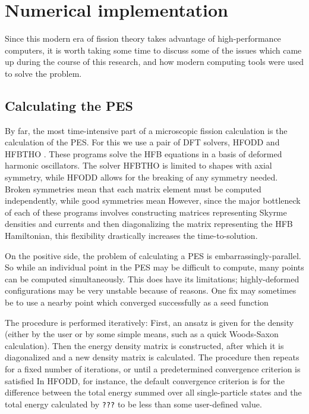 \chapter{Numerical implementation}\label{chap:Numerical}

Since this modern era of fission theory takes advantage of high-performance computers, it is worth taking some time to discuss some of the issues which came up during the course of this research, and how modern computing tools were used to solve the problem.

\section{Calculating the PES}
By far, the most time-intensive part of a microscopic fission calculation is the calculation of the PES. For this we use a pair of DFT solvers, HFODD \cite{Schunck2017} and HFBTHO \cite{Perez2017}. These programs solve the HFB equations in a basis of deformed harmonic oscillators. The solver HFBTHO is limited to shapes with axial symmetry, while HFODD allows for the breaking of any symmetry needed. Broken symmetries mean that each matrix element must be computed independently, while good symmetries mean However, since the major bottleneck of each of these programs involves constructing matrices representing Skyrme densities and currents and then diagonalizing the matrix representing the HFB Hamiltonian, this flexibility drastically increases the time-to-solution.

On the positive side, the problem of calculating a PES is embarrassingly-parallel. So while an individual point in the PES may be difficult to compute, many points can be computed simultaneously. This does have its limitations; highly-deformed configurations may be very unstable because of reasons. One fix may sometimes be to use a nearby point which converged successfully as a seed function

The procedure is performed iteratively: First, an ansatz is given for the density (either by the user or by some simple means, such as a quick Woods-Saxon calculation). Then the energy density matrix is constructed, after which it is diagonalized and a new density matrix is calculated. The procedure then repeats for a fixed number of iterations, or until a predetermined convergence criterion is satisfied In HFODD, for instance, the default convergence criterion is for the difference between the total energy summed over all single-particle states and the total energy calculated by \verb|???| to be less than some user-defined value.

